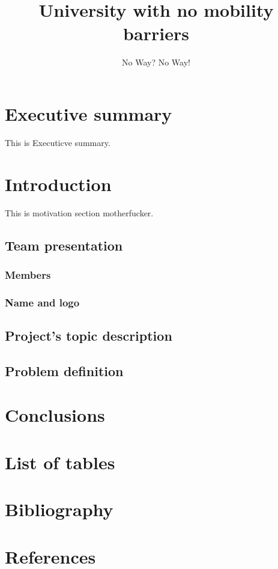 \documentclass[12pt,letterpaper]{article}
\begin{document}
\title{University with no mobility barriers}
\author{No Way? No Way!}
\maketitle

\newpage

\tableofcontents
\renewcommand*\contentsname{Table of contents}


\section{Executive summary}
This is Executicve summary.

\section{Introduction}
This is motivation section motherfucker.

\subsection{Team presentation}

\subsubsection{Members}

\subsubsection{Name and logo}

\subsection{Project's topic description}

\subsection{Problem definition}

\section{Conclusions}

\section{List of tables}

\section{Bibliography}

\section{References}
\end{document}
